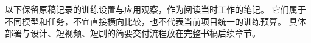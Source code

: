 以下保留原稿记录的训练设置与应用观察，作为阅读当时工作的笔记。
它们属于不同模型和任务，不宜直接横向比较，也不代表当前项目统一的训练预算。
具体部署与设计、短视频、短剧的简要交付流程放在完整书稿后续章节。
